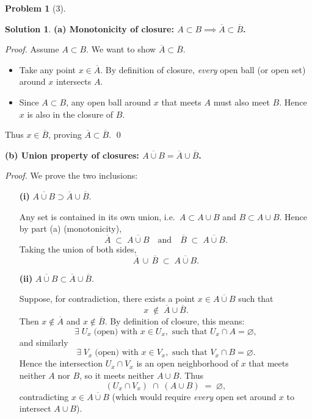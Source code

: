 \documentclass[12pt]{article}
\theoremstyle{definition} %
\newtheorem{solution}{Solution}
\newtheorem{problem}{Problem}
\theoremstyle{plain} %
\begin{document}
\begin{problem}[3]
    
\end{problem}
\begin{solution}
    \noindent
    \textbf{(a) Monotonicity of closure: $A \subset B \implies \overline{A} \subset \overline{B}$.}
    
    \smallskip
    \noindent
    \emph{Proof.} Assume $A \subset B$. We want to show $\overline{A} \subset \overline{B}$.
    \begin{itemize}
    \item Take any point $x \in \overline{A}$. By definition of closure, \emph{every} open ball (or open set) around $x$ intersects $A$.
    \item Since $A \subset B$, any open ball around $x$ that meets $A$ must also meet $B$. Hence $x$ is also in the closure of $B$.
    \end{itemize}
    Thus $x \in \overline{B}$, proving $\overline{A} \subset \overline{B}$. \qed
    
    \bigskip
    
    \noindent
    \textbf{(b) Union property of closures: $\overline{A \cup B} = \overline{A} \cup \overline{B}$.}
    
    \smallskip
    \noindent
    \emph{Proof.} We prove the two inclusions:
    
    \begin{enumerate}
    \item[\textbf{(i)}] $\overline{A \cup B} \supset \overline{A} \cup \overline{B}$.
    
    \smallskip
    Any set is contained in its own union, i.e.\ $A \subset A \cup B$ and $B \subset A \cup B$. Hence by part (a) (monotonicity),
    \[
    \overline{A} \;\subset\; \overline{A \cup B}
    \quad\text{and}\quad
    \overline{B} \;\subset\; \overline{A \cup B}.
    \]
    Taking the union of both sides,
    \[
    \overline{A} \,\cup\, \overline{B}
    \;\subset\;
    \overline{A \cup B}.
    \]
    
    \item[\textbf{(ii)}] $\overline{A \cup B} \subset \overline{A} \cup \overline{B}$.
    
    \smallskip
    Suppose, for contradiction, there exists a point $x \in \overline{A \cup B}$ such that 
    \[
    x \;\notin\; \overline{A} \cup \overline{B}.
    \]
    Then $x \notin \overline{A}$ and $x \notin \overline{B}$. By definition of closure, this means:
    \[
    \exists\;U_x \;\text{(open) with } x \in U_x, \text{ such that } U_x \cap A = \varnothing,
    \]
    and similarly
    \[
    \exists\;V_x \;\text{(open) with } x \in V_x, \text{ such that } V_x \cap B = \varnothing.
    \]
    Hence the intersection $U_x \cap V_x$ is an open neighborhood of $x$ that meets neither $A$ nor $B$, so it meets neither $A \cup B$. Thus
    \[
    (U_x \cap V_x)\;\cap\;(A \cup B) \;=\;\varnothing,
    \]
    contradicting $x \in \overline{A \cup B}$ (which would require \emph{every} open set around $x$ to intersect $A \cup B$).
    

\end{enumerate}
\end{solution}
\end{document}
